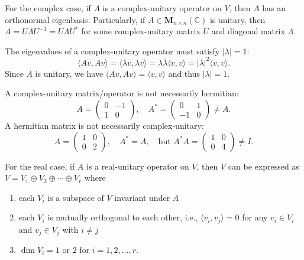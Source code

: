 \documentclass{ctexart}
\newcommand{\M}{\mathbf{M}}
\newcommand{\C}{\mathbb{C}}
\begin{document}
    \begin{mythm}
        For the complex case, if $A$ is a complex-unitary operator on $V$, then $A$ has an orthonormal eigenbasis. Particularly, if $A\in \M_{n\times n}(\C)$ is unitary, then $A=U\Lambda U^{-1} = U \Lambda U^*$ for some complex-unitary matrix $U$ and diagonal matrix $\Lambda$.
    \end{mythm}
    \begin{myrmk}
        The eigenvalues of a complex-unitary operator must satisfy $|\lambda|=1$:
        $$ \langle A v, A v \rangle = \langle \lambda v, \lambda v \rangle = \lambda \overline{\lambda} \langle v, v \rangle = |\lambda|^2 \langle v, v \rangle. $$
         Since $A$ is unitary, we have $\langle A v, A v \rangle = \langle v, v \rangle$ and thus $|\lambda|=1$.
    \end{myrmk}
    \begin{myrmk}
        A complex-unitary matrix/operator is not necessarily hermitian:
        $$ A = \begin{pmatrix}
            0 & -1 \\
            1 & 0
        \end{pmatrix}, \quad A^* = \begin{pmatrix}
            0 & 1 \\
            -1 & 0
        \end{pmatrix} \ne A. $$
        A hermitian matrix is not necessarily complex-unitary:
        $$ A = \begin{pmatrix}
            1 & 0 \\
            0 & 2
        \end{pmatrix}, \quad A^* = A, \quad \text{but } A^* A = \begin{pmatrix}
            1 & 0 \\
            0 & 4
        \end{pmatrix} \ne I. $$
    \end{myrmk}
    \begin{mythm}
        For the real case, if $A$ is a real-unitary operator on $V$, then $V$ can be expressed as $V=V_1 \oplus V_2 \oplus \cdots \oplus V_r$ where
        \begin{enumerate}
            \item each $V_i$ is a subspace of $V$ invariant under $A$
            \item each $V_i$ is mutually orthogonal to each other, i.e., $\langle v_i, v_j \rangle = 0$ for any $v_i \in V_i$ and $v_j \in V_j$ with $i\neq j$
            \item $\dim V_i = 1$ or $2$ for $i=1,2,\ldots,r$.
        \end{enumerate}
    \end{mythm}
\end{document}
